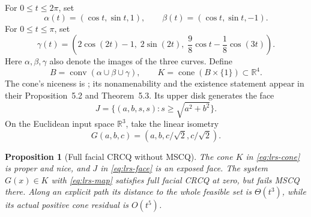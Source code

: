 \documentclass[11pt]{article}
\numberwithin{equation}{section}
\newtheorem{proposition}[theorem]{Proposition}
\theoremstyle{definition}
\theoremstyle{remark}
\DeclareMathOperator{\cone}{cone}
\DeclareMathOperator{\conv}{conv}
\newcommand{\R}{\mathbb R}
\begin{document}
For $0\leq t\leq2\pi$, set
\[
 \alpha(t)=(\cos t,\sin t,1),\qquad
 \beta(t)=(\cos t,\sin t,-1).
\]
For $0\leq t\leq\pi$, set
\[
 \gamma(t)=\left(2\cos(2t)-1,\;2\sin(2t),\;
 \frac98\cos t-\frac18\cos(3t)\right).
\]
Here $\alpha,\beta,\gamma$ also denote the images of the three curves.
Define
\begin{equation}
 B=\conv(\alpha\cup\beta\cup\gamma),\qquad
 K=\cone(B\times\{1\})\subset\R^4.
 \label{eq:lrs-cone}
\end{equation}
The cone's niceness is \citet[Proposition~5.1]{lrs2022}; its
nonamenability and the existence statement appear in their
Proposition~5.2 and Theorem~5.3. Its upper disk generates the face
\begin{equation}
 J=\{(a,b,s,s):s\geq\sqrt{a^2+b^2}\}.
 \label{eq:lrs-face}
\end{equation}
On the Euclidean input space $\R^3$, take the linear isometry
\begin{equation}
 G(a,b,c)=(a,b,c/\sqrt2,c/\sqrt2).
 \label{eq:lrs-map}
\end{equation}
\begin{proposition}[Full facial CRCQ without MSCQ]
\label{prop:counterexample}
The cone $K$ in \eqref{eq:lrs-cone} is proper and nice, and $J$ in
\eqref{eq:lrs-face} is an exposed face. The system
$G(x)\in K$ with \eqref{eq:lrs-map} satisfies full facial CRCQ at zero,
but fails MSCQ there. Along an explicit path its distance to the whole
feasible set is $\Theta(t^3)$, while its actual positive cone residual
is $O(t^5)$.
\end{proposition}
\end{document}
